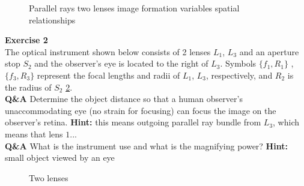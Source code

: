 \documentclass[main.tex]{subfiles}
\begin{document}
\begin{figure}
\centering{}
\caption{Parallel rays two lenses image formation variables spatial relationships}
\label{fig:2_1}
\end{figure}

\textbf{Exercise 2}\\
The optical instrument shown below consists of 2 lenses $L_1$, $L_3$ and an aperture stop $S_2$ and the observer's eye is located to the right of $L_3$. Symbols $\{f_1 , R_1\}$ , $\{f_3 , R_3\}$ represent the focal lengths and radii of $L_1$, $L_3$, respectively, and $R_2$ is the radius of $S_2$ \ref{fig:2_2}.\\

\textbf{Q\&A} Determine the object distance so that a human observer's unaccommodating eye (no strain for focusing) can focus the image on the observer's retina. \textbf{Hint:} this means outgoing parallel ray bundle from $L_3$, which means that lens $1 ...$\\

\textbf{Q\&A} What is the instrument use and what is the magnifying power? \textbf{Hint:} small object viewed by an eye

\begin{figure}
\centering{}
\caption{Two lenses}
\label{fig:2_2}
\end{figure}
\end{document}
